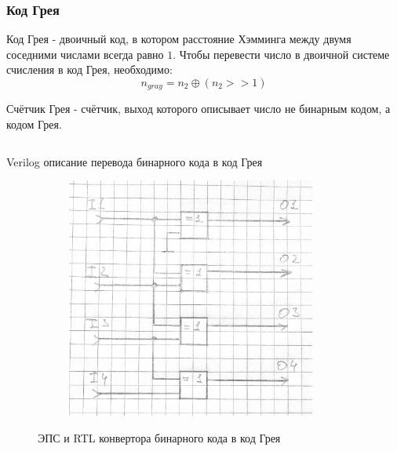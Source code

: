 \documentclass[a4paper]{article}
\begin{document}
  \subsubsection{Код Грея}

  Код Грея - двоичный код, в котором расстояние Хэмминга между двумя соседними
  числами всегда равно $1$. Чтобы перевести число в двоичной системе счисления
  в код Грея, необходимо:
  \begin{equation}
    n_{gray} = n_2 \oplus (n_2 >> 1)
  \end{equation}

  Счётчик Грея - счётчик, выход которого описывает число не бинарным кодом, а кодом Грея.

  \begin{listing}[H]
    \inputminted{verilog}{../chapter_6/bin2gray.v}
    \caption{Verilog описание перевода бинарного кода в код Грея}
  \end{listing}

  \begin{figure}[H]
    \begin{subfigure}[b]{0.25\textwidth}
    \includegraphics[width=0.9\textwidth]{lab_316}
    \end{subfigure}
    \hfill
    \begin{subfigure}[b]{0.7\textwidth}
    \end{subfigure}
    \caption{ЭПС и RTL конвертора бинарного кода в код Грея}
  \end{figure}
\end{document}
